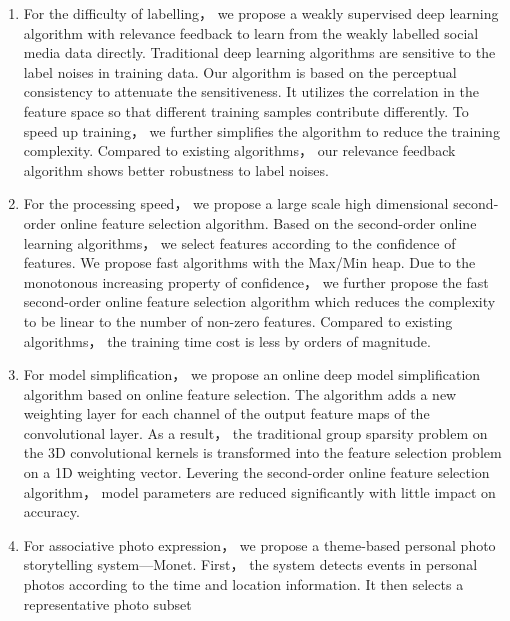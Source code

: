 \begin{enabstract}
    \begin{enumerate}[{(1)}]
        \item For the difficulty of labelling， we propose a weakly supervised
            deep learning algorithm with relevance feedback to learn
            from the weakly labelled social media data directly.
            Traditional deep learning algorithms
            are sensitive to the label noises in training data. Our algorithm
            is based on the perceptual consistency to attenuate the
            sensitiveness. It utilizes the correlation in the feature space
            so that different training samples contribute differently. To speed
            up training， we further simplifies the algorithm to reduce the
            training complexity. Compared to existing algorithms， our relevance
            feedback algorithm shows  better robustness to label noises.
        \item For the processing speed， we propose a large scale high
            dimensional second-order online feature selection algorithm. Based on
            the second-order online learning algorithms， we select features
            according to the confidence of features. We propose fast algorithms
            with the Max/Min heap. Due to the monotonous increasing property of
            confidence， we further propose the fast second-order online feature
            selection algorithm which reduces the complexity to be linear to the
            number of non-zero features. Compared to existing algorithms， the
            training time cost is less by orders of magnitude.
        \item For model simplification， we propose an online deep model
            simplification algorithm based on online feature selection.
            The algorithm adds a new weighting layer for each channel of the
            output feature maps of the convolutional layer. As a result，
            the traditional group sparsity problem on the 3D convolutional kernels
            is transformed into the feature selection problem on a 1D weighting
            vector.  Levering the second-order online feature selection algorithm，
            model parameters are reduced significantly with little impact on accuracy.
        \item For associative photo expression， we propose a theme-based
            personal photo storytelling system---Monet. First， the system
            detects events in personal photos according to the time and
            location information. It then selects a representative photo subset

\end{enumerate}
\end{enabstract}
